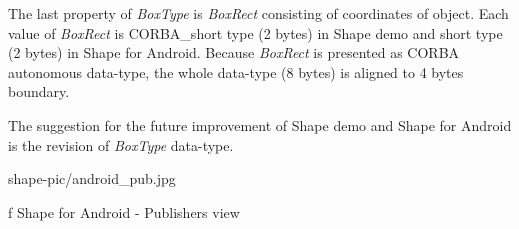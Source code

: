 The last property of {\em BoxType} is {\em BoxRect} consisting of coordinates of object. Each value of {\em BoxRect} is CORBA\_short type (2 bytes) in Shape demo and short type (2 bytes) in Shape for Android. Because {\em BoxRect} is presented as CORBA autonomous data-type, the whole data-type (8 bytes) is aligned to 4 bytes boundary.

The suggestion for the future improvement of Shape demo and Shape for Android is the revision of {\em BoxType} data-type.

\midinsert
\picw=10cm \cinspic shape-pic/android_pub.jpg
\caption/f Shape for Android - Publishers view
\endinsert

